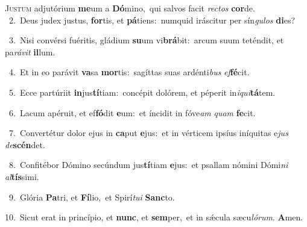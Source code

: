 \lettrine{\initial\textcolor{\initialcolor}{J}}{ustum} adjutórium \textbf{me}\-um a \textbf{Dó}\-mino,~\star qui salvos facit \textit{rec}\-\textit{tos} \textbf{cor}\-de.\\
{\numbfont\textcolor{\numbcolor}{~2.}}~Deus judex justus, \textbf{for}\-tis, et \textbf{pá}\-tiens:~\star numquid iráscitur per sín\-\textit{gu}\-\textit{los} \textbf{di}\-es?\par
{\numbfont\textcolor{\numbcolor}{~3.}}~Nisi convérsi fuéritis, gládium \textbf{su}\-um vi\-\textbf{brá}\-bit:~\star arcum suum teténdit, et pa\-\textit{rá}\-\textit{vit} \textbf{il}\-lum.\par
{\numbfont\textcolor{\numbcolor}{~4.}}~Et in eo parávit \textbf{va}\-sa \textbf{mor}\-tis:~\star sagíttas suas ardénti\textit{bus} \textit{ef}\-\textbf{fé}cit.\par
{\numbfont\textcolor{\numbcolor}{~5.}}~Ecce partúriit \textbf{in}\-jus\-\textbf{tí}\-tiam:~\star concépit dolórem, et péperit in\-\textit{i}\-\textit{qui}\textbf{tá}tem.\par
{\numbfont\textcolor{\numbcolor}{~6.}}~Lacum apéruit, et ef\-\textbf{fó}\-dit \textbf{e}\-um:~\star et íncidit in fóve\textit{am} \textit{quam} \textbf{fe}\-cit.\par
{\numbfont\textcolor{\numbcolor}{~7.}}~Convertétur dolor ejus in \textbf{ca}\-put \textbf{e}\-jus:~\star et in vérticem ipsíus iníquitas e\textit{jus} \textit{de}\-\textbf{scén}det.\par
{\numbfont\textcolor{\numbcolor}{~8.}}~Confitébor Dómino secúndum jus\-\textbf{tí}\-tiam \textbf{e}\-jus:~\star et psallam nómini Dómi\textit{ni} \textit{al}\-\textbf{tís}simi.\par
{\numbfont\textcolor{\numbcolor}{~9.}}~Glória \textbf{Pa}\-tri, et \textbf{Fí}\-lio,~\star et Spirí\-\textit{tu}\-\textit{i} \textbf{Sanc}\-to.\par
{\numbfont\textcolor{\numbcolor}{10.}}~Sicut erat in princípio, et \textbf{nunc}\-, et \textbf{sem}\-per,~\star et in sǽcula sæcu\-\textit{ló}\-\textit{rum}. \textbf{A}\-men.\par
